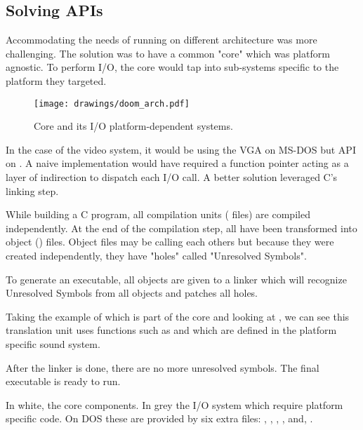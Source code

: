 \subsection{Solving APIs}
Accommodating the needs of running on different architecture was more challenging. The solution was to have a common "core" which was platform agnostic. To perform I/O, the core would tap into sub-systems specific to the platform they targeted.\\
\par
\begin{figure}[H]
\centering
\texttt{[image: drawings/doom\_arch.pdf]}
\caption{\doom Core and its I/O platform-dependent systems.}
\end{figure}
\par
In the case of the video system, it would be using the VGA on MS-DOS but  API on \NeXT. A naive implementation would have required a function pointer acting as a layer of indirection to dispatch each I/O call. A better solution leveraged C's linking step.\\
\par
 While building a C program, all compilation units ( files) are compiled independently. At the end of the compilation step, all  have been transformed into object () files. Object files may be calling each others but because they were created independently, they have "holes" called "Unresolved Symbols".\\
\par
 To generate an executable, all objects are given to a linker which will recognize Unresolved Symbols from all objects and patches all holes.\\
 \par
 Taking the example of  which is part of the core and looking at , we can see this translation unit uses functions such as  and  which are defined in the platform specific sound system. \\
\par
{}
\par
After the linker is done, there are no more unresolved symbols. The final executable is ready to run.\\
\par
{}




\pagebreak
{}
\par
In white, the core components. In grey the I/O system which require platform specific code. On DOS these are provided by six extra files: , , , ,  and, .\\







